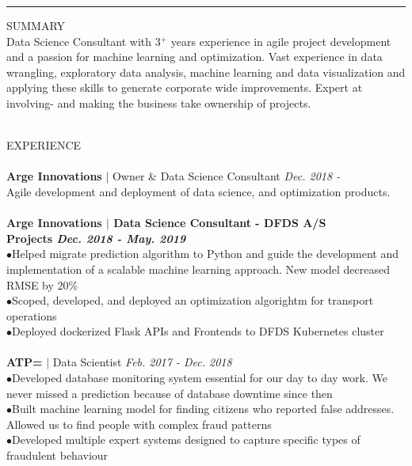 \documentclass[10pt,a4paper]{article}
\newcommand{\newprojects}[3]{\\\textbf{#1}\\#2\\ \makebullet{#3}\\}
\newcommand{\headline}[1]{\Large \textcolor{myblue}{#1}}
\newcommand{\accomplishment}[1]{{\hspace*{-9pt}\textcolor{myblue}{$\bullet$}}\hspace*{4pt}\linespread{1.1}\footnotesize#1}
\begin{document}
\vspace{0.9cm}
\hrule height 0.4mm
\vspace{0.5cm}
{\headline{SUMMARY}}\\
Data Science Consultant with 3$^+$ years experience in agile project development and a passion for machine learning and optimization. Vast experience in data wrangling, exploratory data analysis, machine learning and data visualization and applying these skills to generate corporate wide improvements. Expert at involving- and making the business take ownership of projects.\\
\vspace{0.3cm}
\\
  \begin{minipage}[t]{0.66\linewidth}
    {\headline{EXPERIENCE}}\\
    \vspace{-8pt}\\
    \textbf{Arge Innovations} $|$ Owner \& Data Science Consultant \hfill \textit{Dec. 2018 -} \\
    Agile development and deployment of data science, and optimization products.\\
    \newprojects{Arge Innovations $|$ Data Science Consultant - DFDS A/S \\ Projects \hfill \textmd{\textit{Dec. 2018 - May. 2019}}}%
        {%
            \accomplishment{Helped migrate prediction algorithm to Python and guide the development and implementation of a scalable machine learning approach. New model decreased RMSE by 20\%}\\%
            \accomplishment{Scoped, developed, and deployed an optimization algorightm for transport operations}\\%
            \accomplishment{Deployed dockerized Flask APIs and Frontends to DFDS Kubernetes cluster}%
        }{}
    \normalsize \textbf{ATP=} $|$ Data Scientist \hfill \textit{Feb. 2017 - Dec. 2018} \\
    \accomplishment{Developed database monitoring system essential for our day to day work. We never missed a prediction because of database downtime since then}\\
    \accomplishment{Built machine learning model for finding citizens who reported false addresses. Allowed us to find people with complex fraud patterns}\\
    \accomplishment{Developed multiple expert systems designed to capture specific types of fraudulent behaviour}\\

\end{minipage}
\end{document}
